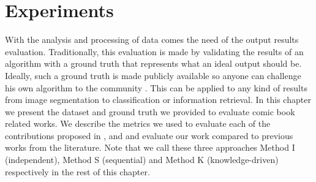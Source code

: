 \chapter{Experiments}
\label{chap:experimentations}
\graphicspath{{./chapters/6-experiments/figs/}}



With the analysis and processing of data comes the need of the output results evaluation.
Traditionally, this evaluation is made by validating the results of an algorithm with a ground truth that represents what an ideal output should be\cite{pascal-voc-2012, smeaton2006evaluation, griffinHolubPerona}.
Ideally, such a ground truth is made publicly available so anyone can challenge his own algorithm to the community \cite{lamiroy:inria-00537035}.
This can be applied to any kind of results from image segmentation to classification or information retrieval.
In this chapter we present the dataset and ground truth we provided to evaluate comic book related works.
We describe the metrics we used to evaluate each of the contributions proposed in ,  and  and evaluate our work compared to previous works from the literature.
Note that we call these three approaches Method I (independent), Method S (sequential) and Method K (knowledge-driven) respectively in the rest of this chapter.






